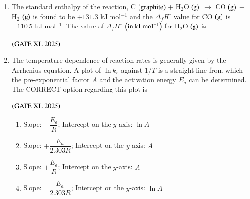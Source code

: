 \documentclass[journal]{IEEEtran}
\begin{document}
\begin{enumerate}
    \begin{enumerate}
    \end{enumerate}

    \item The standard enthalpy of the reaction, C $\left(\text{graphite}\right)$ + H$_2$O $\left(\text{g}\right)$ $\rightarrow$ CO $\left(\text{g}\right)$ + H$_2$ $\left(\text{g}\right)$ is found to be $+131.3$ kJ mol$^{-1}$ and the $\Delta_f H^\circ$ value for CO $\left(\text{g}\right)$ is $-110.5$ kJ mol$^{-1}$. The value of $\Delta_f H^\circ$ $\left(\text{in kJ mol}^{-1}\right)$ for H$_2$O $\left(\text{g}\right)$ is

    \hfill $\left(\text{GATE XL 2025}\right)$

    \begin{enumerate}
    \end{enumerate}

    \item The temperature dependence of reaction rates is generally given by the Arrhenius equation. A plot of $\ln k_r$ against $1/T$ is a straight line from which the pre-exponential factor $A$ and the activation energy $E_a$ can be determined. The CORRECT option regarding this plot is

    \hfill $\left(\text{GATE XL 2025}\right)$

    \begin{enumerate}
        \item Slope: $-\dfrac{E_a}{R}$; Intercept on the $y$-axis: $\ln A$
        \item Slope: $+\dfrac{E_a}{2.303R}$; Intercept on the $y$-axis: $A$
        \item Slope: $+\dfrac{E_a}{R}$; Intercept on the $y$-axis: $A$
        \item Slope: $-\dfrac{E_a}{2.303R}$; Intercept on the $y$-axis: $\ln A$
    \end{enumerate}


\end{enumerate}
\end{document}
